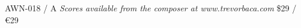\documentclass{article}
\begin{document}
\null \vfill

AWN-018 / A \hfill
\textit{Scores available from the composer at www.trevorbaca.com}
\hfill \$29 / \euro 29
\end{document}
